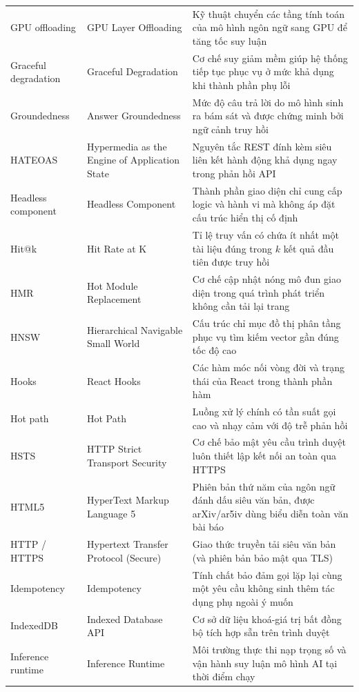 {\begin{longtable}{@{}>{\raggedright\arraybackslash}p{3.4cm}>{\raggedright\arraybackslash}p{4.7cm}>{\raggedright\arraybackslash}p{7.15cm}@{}}
    GPU offloading & GPU Layer Offloading & Kỹ thuật chuyển các tầng tính toán của mô hình ngôn ngữ sang GPU để tăng tốc suy luận \\
    Graceful degradation & Graceful Degradation & Cơ chế suy giảm mềm giúp hệ thống tiếp tục phục vụ ở mức khả dụng khi thành phần phụ lỗi \\
    Groundedness & Answer Groundedness & Mức độ câu trả lời do mô hình sinh ra bám sát và được chứng minh bởi ngữ cảnh truy hồi \\
    HATEOAS & Hypermedia as the Engine of Application State & Nguyên tắc REST đính kèm siêu liên kết hành động khả dụng ngay trong phản hồi API \\
    Headless component & Headless Component & Thành phần giao diện chỉ cung cấp logic và hành vi mà không áp đặt cấu trúc hiển thị cố định \\
    Hit@k & Hit Rate at K & Tỉ lệ truy vấn có chứa ít nhất một tài liệu đúng trong $k$ kết quả đầu tiên được truy hồi \\
    HMR & Hot Module Replacement & Cơ chế cập nhật nóng mô đun giao diện trong quá trình phát triển không cần tải lại trang \\
    HNSW & Hierarchical Navigable Small World & Cấu trúc chỉ mục đồ thị phân tầng phục vụ tìm kiếm vector gần đúng tốc độ cao \\
    Hooks & React Hooks & Các hàm móc nối vòng đời và trạng thái của React trong thành phần hàm \\
    Hot path & Hot Path & Luồng xử lý chính có tần suất gọi cao và nhạy cảm với độ trễ phản hồi \\
    HSTS & HTTP Strict Transport Security & Cơ chế bảo mật yêu cầu trình duyệt luôn thiết lập kết nối an toàn qua HTTPS \\
    HTML5 & HyperText Markup Language 5 & Phiên bản thứ năm của ngôn ngữ đánh dấu siêu văn bản, được arXiv/ar5iv dùng biểu diễn toàn văn bài báo \\
    HTTP / HTTPS & Hypertext Transfer Protocol (Secure) & Giao thức truyền tải siêu văn bản (và phiên bản bảo mật qua TLS) \\
    Idempotency & Idempotency & Tính chất bảo đảm gọi lặp lại cùng một yêu cầu không sinh thêm tác dụng phụ ngoài ý muốn \\
    IndexedDB & Indexed Database API & Cơ sở dữ liệu khoá-giá trị bất đồng bộ tích hợp sẵn trên trình duyệt \\
    Inference runtime & Inference Runtime & Môi trường thực thi nạp trọng số và vận hành suy luận mô hình AI tại thời điểm chạy \\

\end{longtable}}
